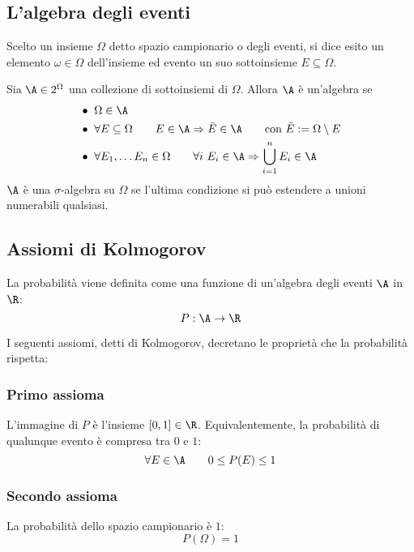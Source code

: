 \subsection{L'algebra degli eventi}
\begin{defin}
	Scelto un insieme $\Omega$ detto spazio campionario o degli eventi, si dice esito un elemento $\omega\in\Omega$ dell'insieme ed evento un suo sottoinsieme $E\subseteq\Omega$.

\end{defin}
\begin{defin}
	Sia $\A\in2^\Omega$ una collezione di sottoinsiemi di $\Omega$. Allora $\A$ è un'algebra se
	\begin{align*}
		 & \bullet ~ \Omega\in \A                                                                                            \\
		 & \bullet ~ \forall E\subseteq\Omega\qquad E\in\A\Rightarrow \bar E\in\A \qquad\text{con }\bar E:=\Omega\setminus E \\
		 & \bullet ~ \forall E_1,\dots E_n\in\Omega\qquad \forall i~E_i\in\A\Rightarrow \bigcup\limits_{i=1}^n E_i \in\A
	\end{align*}
	$\A$ è una $\sigma$-algebra su $\Omega$ se l'ultima condizione si può estendere a unioni numerabili qualsiasi.
\end{defin}




\subsection{Assiomi di Kolmogorov}
La probabilità viene definita come una funzione di un'algebra degli eventi $\A$ in $\R$:
\begin{equation*}
	P:\A\to\R
\end{equation*}

I seguenti assiomi, detti di Kolmogorov, decretano le proprietà che la probabilità rispetta:


\subsubsection{Primo assioma}
L'immagine di $P$ è l'insieme $[0,1]\in\R$. Equivalentemente, la probabilità di qualunque evento è compresa tra $0$ e $1$:
\begin{equation*}
	\forall E\in\A\qquad 0\leq P(E)\leq 1
\end{equation*}


\subsubsection{Secondo assioma}
La probabilità dello spazio campionario è $1$:
\begin{equation*}
	P(\Omega)=1
\end{equation*}


